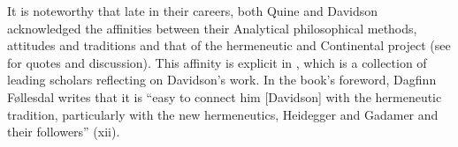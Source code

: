 It is noteworthy that late in their careers, both Quine and Davidson acknowledged the affinities between their Analytical philosophical methods, attitudes and traditions and that of the hermeneutic and Continental project (see \citealt{Slezak2018} for quotes and discussion). This affinity is explicit in \citet{Malpas2011}, which is a collection of leading scholars reflecting on Davidson’s work. In the book’s foreword, Dagfinn Føllesdal writes that it is “easy to connect him [Davidson] with the hermeneutic tradition, particularly with the new hermeneutics, Heidegger and Gadamer and their followers” (xii).